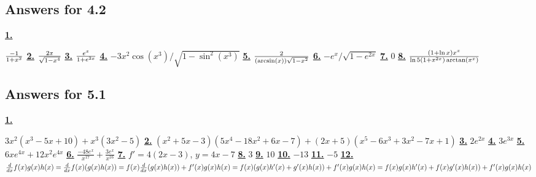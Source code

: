 \subsection *{Answers for 4.2}
\hypertarget {a:4.2.1}{\hyperlink {e:4.2.1}{\bfseries 1.}} \mdseries ${-1\over 1+x^2}$\qquad 
\hypertarget {a:4.2.2}{\hyperlink {e:4.2.2}{\bfseries 2.}} \mdseries ${2x\over \sqrt {1-x^4}}$\qquad 
\hypertarget {a:4.2.3}{\hyperlink {e:4.2.3}{\bfseries 3.}} \mdseries ${e^x\over 1+e^{2x}}$\qquad 
\hypertarget {a:4.2.4}{\hyperlink {e:4.2.4}{\bfseries 4.}} \mdseries $-3x^2\cos (x^3)/\sqrt {1-\sin ^2(x^3)}$\qquad 
\hypertarget {a:4.2.5}{\hyperlink {e:4.2.5}{\bfseries 5.}} \mdseries ${2\over (\arcsin (x))\sqrt {1-x^2}}$\qquad 
\hypertarget {a:4.2.6}{\hyperlink {e:4.2.6}{\bfseries 6.}} \mdseries $-e^x/\sqrt {1-e^{2x}}$\qquad 
\hypertarget {a:4.2.7}{\hyperlink {e:4.2.7}{\bfseries 7.}} \mdseries $0$\qquad 
\hypertarget {a:4.2.8}{\hyperlink {e:4.2.8}{\bfseries 8.}} \mdseries ${(1+\ln x)x^x\over \ln 5(1+x^{2x})\arctan (x^x)}$\qquad 
\subsection *{Answers for 5.1}
\hypertarget {a:5.1.1}{\hyperlink {e:5.1.1}{\bfseries 1.}} \mdseries $3x^2(x^3-5x+10)+x^3(3x^2-5)$\qquad 
\hypertarget {a:5.1.2}{\hyperlink {e:5.1.2}{\bfseries 2.}} \mdseries $(x^2+5x-3)(5x^4-18x^2+6x-7)+(2x+5)(x^5-6x^3+3x^2-7x+1)$\qquad 
\hypertarget {a:5.1.3}{\hyperlink {e:5.1.3}{\bfseries 3.}} \mdseries $2e^{2x}$\qquad 
\hypertarget {a:5.1.4}{\hyperlink {e:5.1.4}{\bfseries 4.}} \mdseries $3e^{3x}$\qquad 
\hypertarget {a:5.1.5}{\hyperlink {e:5.1.5}{\bfseries 5.}} \mdseries $6xe^{4x}+12x^2e^{4x}$\qquad 
\hypertarget {a:5.1.6}{\hyperlink {e:5.1.6}{\bfseries 6.}} \mdseries $\frac {-48e^x}{x^{17}}+\frac {3e^x}{x^{16}}$\qquad 
\hypertarget {a:5.1.7}{\hyperlink {e:5.1.7}{\bfseries 7.}} \mdseries $f'=4(2x-3)$, $y=4x-7$\qquad 
\hypertarget {a:5.1.8}{\hyperlink {e:5.1.8}{\bfseries 8.}} \mdseries $3$\qquad 
\hypertarget {a:5.1.9}{\hyperlink {e:5.1.9}{\bfseries 9.}} \mdseries $10$\qquad 
\hypertarget {a:5.1.10}{\hyperlink {e:5.1.10}{\bfseries 10.}} \mdseries $-13$\qquad 
\hypertarget {a:5.1.11}{\hyperlink {e:5.1.11}{\bfseries 11.}} \mdseries $-5$\qquad 
\hypertarget {a:5.1.12}{\hyperlink {e:5.1.12}{\bfseries 12.}} \mdseries $\frac{d}{dx} f(x)g(x)h(x) = \frac{d}{dx} f(x)(g(x)h(x)) = f(x) \frac{d}{dx} (g(x) h(x)) + f'(x) g(x) h(x) = f(x) (g(x) h'(x)+ g'(x)h(x)) + f'(x) g(x) h(x) = f(x)g(x)h'(x)+ f(x) g'(x)h(x)) + f'(x) g(x) h(x)$\qquad 
